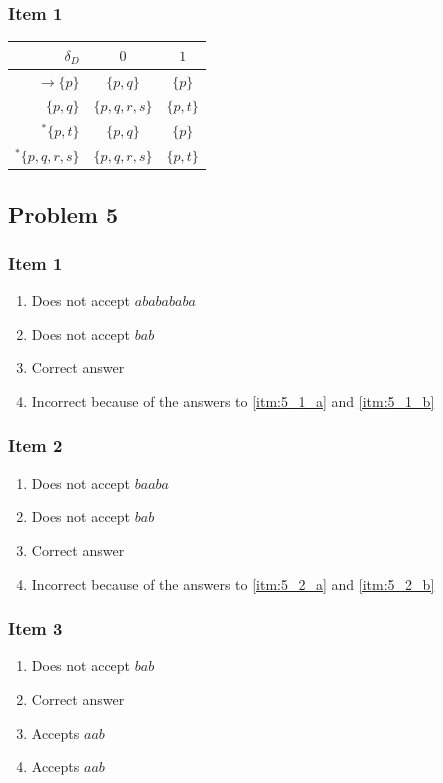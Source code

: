 \subsubsection{Item 1}
\begin{center}
\begin{tabular}{r | c c}
	$\delta_D                 $ & $0          $ & $1      $ \\ \hline
	$\rightarrow \{p        \}$ & $\{p,q    \}$ & $\{p  \}$ \\
	$            \{p,q      \}$ & $\{p,q,r,s\}$ & $\{p,t\}$ \\
	$       ^\ast\{p,      t\}$ & $\{p,q    \}$ & $\{p  \}$ \\
	$       ^\ast\{p,q,r,s  \}$ & $\{p,q,r,s\}$ & $\{p,t\}$
\end{tabular}
\end{center}
\setcounter{subsection}{4}
\subsection{Problem 5}
\subsubsection{Item 1}
\begin{enumerate}[label=(\alph*)]
	\item \label{itm:5_1_a} Does not accept $ababababa$
	\item \label{itm:5_1_b} Does not accept $bab$
	\item \label{itm:5_1_correct} Correct answer
	\item Incorrect because of the answers to \ref{itm:5_1_a} and \ref{itm:5_1_b} 
\end{enumerate}
\subsubsection{Item 2}
\begin{enumerate}[label=(\alph*)]
	\item \label{itm:5_2_a} Does not accept $baaba$
	\item \label{itm:5_2_b} Does not accept $bab$
	\item \label{itm:5_2_correct} Correct answer
	\item Incorrect because of the answers to \ref{itm:5_2_a} and \ref{itm:5_2_b} 
\end{enumerate}
\subsubsection{Item 3}
\begin{enumerate}[label=(\alph*)]
	\item Does not accept $bab$
	\item \label{itm:5_3_correct} Correct answer
	\item Accepts $aab$
	\item Accepts $aab$
\end{enumerate}
\setcounter{subsection}{5}
